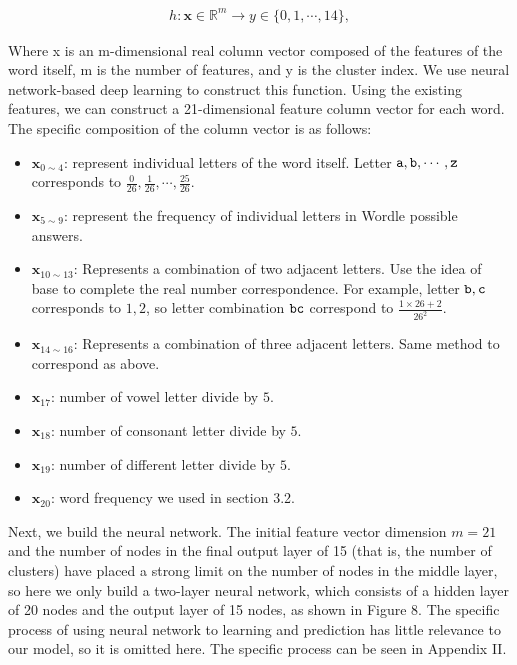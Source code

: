 \begin{equation}
	\begin{aligned}
		h: {\boldsymbol x} \in \mathbb R^{m} \to y \in \{0, 1, \cdots, 14\},
	\end{aligned}
\end{equation}

Where x is an m-dimensional real column vector composed of the features of the word itself, m is the number of features, and y is the cluster index. We use neural network-based deep learning to construct this function. Using the existing features, we can construct a 21-dimensional feature column vector for each word. The specific composition of the column vector is as follows:

\begin{itemize}
	\item $\boldsymbol x_{0 \sim 4}$: represent individual letters of the word itself. Letter $\tt a, b, \cdots, \tt z$ corresponds to $\displaystyle\frac{0}{26}, \frac{1}{26}, \cdots, \frac{25}{26}$.
	\item $\boldsymbol x_{5 \sim 9}$: represent the frequency of individual letters in Wordle possible answers.
	\item $\boldsymbol x_{10 \sim 13}$: Represents a combination of two adjacent letters. Use the idea of base to complete the real number correspondence. For example, letter $\tt b, c$ corresponds to $1, 2$, so letter combination $\tt bc$ correspond to $\displaystyle\frac{1 \times 26 + 2}{26^2}$.
	\item $\boldsymbol x_{14 \sim 16}$: Represents a combination of three adjacent letters. Same method to correspond as above.
	\item $\boldsymbol x_{17}$: number of vowel letter divide by $5$.
	\item $\boldsymbol x_{18}$: number of consonant letter divide by $5$.
	\item $\boldsymbol x_{19}$: number of different letter divide by $5$.
	\item $\boldsymbol x_{20}$: word frequency we used in section 3.2.	
\end{itemize}

Next, we build the neural network. The initial feature vector dimension $m=21$ and the number of nodes in the final output layer of 15 (that is, the number of clusters) have placed a strong limit on the number of nodes in the middle layer, so here we only build a two-layer neural network, which consists of a hidden layer of 20 nodes and the output layer of 15 nodes, as shown in Figure 8. The specific process of using neural network to learning and prediction has little relevance to our model, so it is omitted here. The specific process can be seen in Appendix II.

